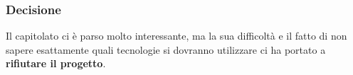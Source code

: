 \subsubsection{Decisione}
Il capitolato ci è parso molto interessante, ma la sua difficoltà e il fatto di non sapere esattamente quali tecnologie si dovranno utilizzare ci ha portato a \textbf{rifiutare il progetto}.
